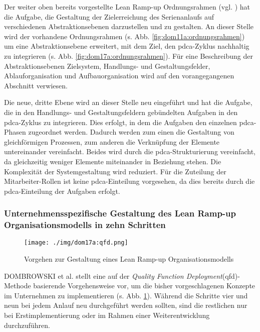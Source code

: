 Der weiter oben bereits vorgestellte Lean Ramp-up Ordnungsrahmen (vgl. \cite{Dombrowski2011a}) hat die Aufgabe, die Gestaltung der Zielerreichung des Serienanlaufs auf verschiedenen Abstraktionsebenen darzustellen und zu gestalten. 
An dieser Stelle wird der vorhandene Ordnungsrahmen (s. Abb. \ref{fig:dom11a:ordnungsrahmen}) um eine Abstraktionsebene erweitert, mit dem Ziel, den \gls{pdca}-Zyklus nachhaltig zu integrieren (s. Abb. \ref{fig:dom17a:ordnungsrahmen}). 
Für eine Beschreibung der Abstraktionsebenen Zielsystem, Handlungs- und Gestaltungsfelder, Ablauforganisation und Aufbauorganisation wird auf den vorangegangenen Abschnitt %
verwiesen. 

Die neue, dritte Ebene wird an dieser Stelle neu eingeführt und hat die Aufgabe, die in den Handlungs- und Gestaltungsfeldern gebündelten Aufgaben in den \gls{pdca}-Zyklus zu integrieren. Dies erfolgt, in dem die Aufgaben den einzelnen \gls{pdca}-Phasen zugeordnet werden. Dadurch werden zum einen die Gestaltung von gleichförmigen Prozessen, zum anderen die Verknüpfung der Elemente untereinander vereinfacht. Beides wird durch die \gls{pdca}-Strukturierung vereinfacht, da gleichzeitig weniger Elemente miteinander in Beziehung stehen. Die Komplexität der Systemgestaltung wird reduziert. 
% 
Für die Zuteilung der Mitarbeiter-Rollen ist keine \gls{pdca}-Einteilung vorgesehen, da dies bereits durch die \gls{pdca}-Einteilung der Aufgaben erfolgt. 


\subsubsection{Unternehmensspezifische Gestaltung des Lean Ramp-up Organisationsmodells in zehn Schritten}\label{sec:zehnschritte}

\begin{figure}[ht]
 \centering
 \texttt{[image: ./img/dom17a:qfd.png]}
 \caption[Vorgehen zur Gestaltung eines Lean Ramp-up Organisationsmodells]{Vorgehen zur Gestaltung eines Lean Ramp-up Organisationsmodells \autocite{Dombrowski2017a}}
 \label{fig:dom17a:qfd}
\end{figure}

DOMBROWSKI et al. stellt eine auf der \textit{Quality Function Deployment}(\gls{qfd})-Methode basierende Vorgehensweise vor, um die bisher vorgeschlagenen Konzepte im Unternehmen zu implementieren (s. Abb. \ref{fig:dom17a:qfd}). 
Während die Schritte vier und neun bei jedem Anlauf neu durchgeführt werden sollten, sind die restlichen nur bei Erstimplementierung oder im Rahmen einer Weiterentwicklung durchzuführen. 

